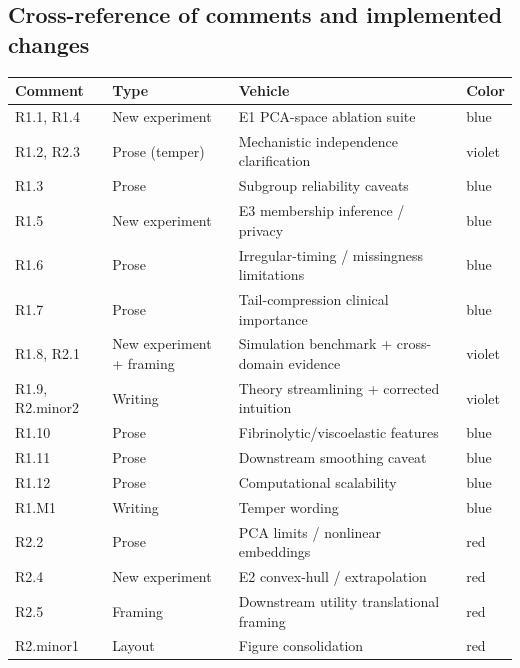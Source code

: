 \documentclass[
  11pt,
  letterpaper,
]{article}
\newcounter{none} %
\begin{document}
\subsection{Cross-reference of comments and implemented changes}\label{cross-reference-of-comments-and-implemented-changes}

{\def\LTcaptype{none} %
\begin{longtable}[]{@{}llll@{}}
\toprule\noalign{}
Comment & Type & Vehicle & Color \\
\midrule\noalign{}
\endhead
\bottomrule\noalign{}
\endlastfoot
R1.1, R1.4 & New experiment & E1 PCA-space ablation suite & blue \\
R1.2, R2.3 & Prose (temper) & Mechanistic independence clarification & violet \\
R1.3 & Prose & Subgroup reliability caveats & blue \\
R1.5 & New experiment & E3 membership inference / privacy & blue \\
R1.6 & Prose & Irregular-timing / missingness limitations & blue \\
R1.7 & Prose & Tail-compression clinical importance & blue \\
R1.8, R2.1 & New experiment + framing & Simulation benchmark + cross-domain evidence & violet \\
R1.9, R2.minor2 & Writing & Theory streamlining + corrected intuition & violet \\
R1.10 & Prose & Fibrinolytic/viscoelastic features & blue \\
R1.11 & Prose & Downstream smoothing caveat & blue \\
R1.12 & Prose & Computational scalability & blue \\
R1.M1 & Writing & Temper wording & blue \\
R2.2 & Prose & PCA limits / nonlinear embeddings & red \\
R2.4 & New experiment & E2 convex-hull / extrapolation & red \\
R2.5 & Framing & Downstream utility translational framing & red \\
R2.minor1 & Layout & Figure consolidation & red \\
\end{longtable}
}
\end{document}
